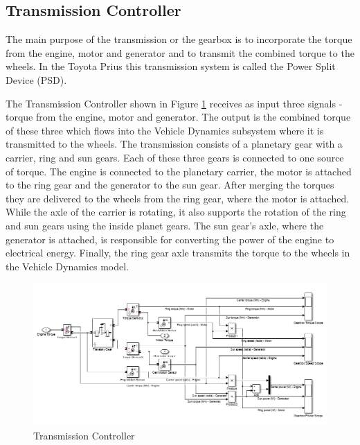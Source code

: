 \subsection{Transmission Controller}
The main purpose of the transmission or the gearbox is to incorporate the torque from the engine, motor and generator and to transmit the combined torque to the wheels. In the Toyota Prius this transmission system is called the Power Split Device (PSD). 

The Transmission Controller shown in Figure \ref{fig:transmissioncontroller} receives as input three signals - torque from the engine, motor and generator. The output is the combined torque of these three which flows into the Vehicle Dynamics subsystem where it is transmitted to the wheels. The transmission consists of a planetary gear with a carrier, ring and sun gears. Each of these three gears is connected to one source of torque. The engine is connected to the planetary carrier, the motor is attached to the ring gear and the generator to the sun gear. After merging the torques they are delivered to the wheels from the ring gear, where the motor is attached. While the axle of the carrier is rotating, it also supports the rotation of the ring and sun gears using the inside planet gears. The sun gear's axle, where the generator is attached, is responsible for converting the power of the engine to electrical energy. Finally, the ring gear axle transmits the torque to the wheels in the Vehicle Dynamics model. 

\begin{figure}[h]
\centering
\includegraphics[scale=0.55]{figures/hev/transmissioncontroller}
\caption{Transmission Controller}
\label{fig:transmissioncontroller}
\end{figure}

